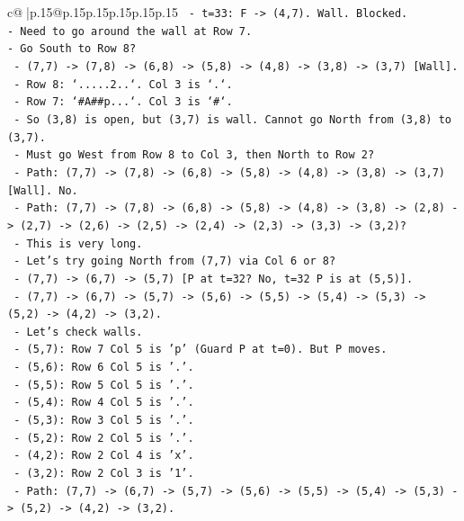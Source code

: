 \documentclass{article}
\begin{document}
{\begin{supertabular}{c@{$\;$}|p{.15\linewidth}@{}p{.15\linewidth}p{.15\linewidth}p{.15\linewidth}p{.15\linewidth}p{.15\linewidth}}
{{{\texttt{    {-} t=33: F {-}> (4,7). Wall. Blocked.} \\
\texttt{{-} Need to go around the wall at Row 7.} \\
\texttt{{-} Go South to Row 8?} \\
\texttt{  {-} (7,7) {-}> (7,8) {-}> (6,8) {-}> (5,8) {-}> (4,8) {-}> (3,8) {-}> (3,7) {[}Wall{]}.} \\
\texttt{  {-} Row 8: `.....2..`. Col 3 is `.`.} \\
\texttt{  {-} Row 7: `\#A\#\#p...`. Col 3 is `\#`.} \\
\texttt{  {-} So (3,8) is open, but (3,7) is wall. Cannot go North from (3,8) to (3,7).} \\
\texttt{  {-} Must go West from Row 8 to Col 3, then North to Row 2?} \\
\texttt{  {-} Path: (7,7) {-}> (7,8) {-}> (6,8) {-}> (5,8) {-}> (4,8) {-}> (3,8) {-}> (3,7) {[}Wall{]}. No.} \\
\texttt{  {-} Path: (7,7) {-}> (7,8) {-}> (6,8) {-}> (5,8) {-}> (4,8) {-}> (3,8) {-}> (2,8) {-}> (2,7) {-}> (2,6) {-}> (2,5) {-}> (2,4) {-}> (2,3) {-}> (3,3) {-}> (3,2)?} \\
\texttt{    {-} This is very long.} \\
\texttt{  {-} Let's try going North from (7,7) via Col 6 or 8?} \\
\texttt{    {-} (7,7) {-}> (6,7) {-}> (5,7) {[}P at t=32? No, t=32 P is at (5,5){]}.} \\
\texttt{    {-} (7,7) {-}> (6,7) {-}> (5,7) {-}> (5,6) {-}> (5,5) {-}> (5,4) {-}> (5,3) {-}> (5,2) {-}> (4,2) {-}> (3,2).} \\
\texttt{    {-} Let's check walls.} \\
\texttt{    {-} (5,7): Row 7 Col 5 is 'p' (Guard P at t=0). But P moves.} \\
\texttt{    {-} (5,6): Row 6 Col 5 is '.'.} \\
\texttt{    {-} (5,5): Row 5 Col 5 is '.'.} \\
\texttt{    {-} (5,4): Row 4 Col 5 is '.'.} \\
\texttt{    {-} (5,3): Row 3 Col 5 is '.'.} \\
\texttt{    {-} (5,2): Row 2 Col 5 is '.'.} \\
\texttt{    {-} (4,2): Row 2 Col 4 is 'x'.} \\
\texttt{    {-} (3,2): Row 2 Col 3 is '1'.} \\
\texttt{    {-} Path: (7,7) {-}> (6,7) {-}> (5,7) {-}> (5,6) {-}> (5,5) {-}> (5,4) {-}> (5,3) {-}> (5,2) {-}> (4,2) {-}> (3,2).} \\
}}}
\end{supertabular}}
\end{document}
